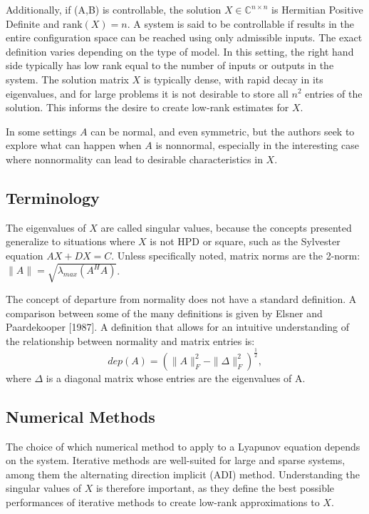 \documentclass[12pt]{scrartcl}
\newcommand{\Cnn}{\mathbb{C}^{n \times n}}
\begin{document}
Additionally, if (A,B) is controllable, the solution $X \in \Cnn$ is Hermitian Positive Definite and $\text{rank}(X) = n$. A system is said to be controllable if results in the entire configuration space can be reached using only admissible inputs. The exact definition varies depending on the type of model. In this setting, the right hand side typically has low rank equal to the number of inputs or outputs in the system. The solution matrix $X$ is typically dense, with rapid decay in its eigenvalues, and for large problems it is not desirable to store all $n^{2}$ entries of the solution. \cite{PEN1} This informs the desire to create low-rank estimates for $X$. 

In some settings $A$ can be normal, and even symmetric, but the authors seek to explore what can happen when $A$ is nonnormal, especially in the interesting case where nonnormality can lead to desirable characteristics in $X$. 

\subsection{Terminology}

The eigenvalues of $X$ are called singular values, because the concepts presented generalize to situations where $X$ is not HPD or square, such as the Sylvester equation $AX + DX = C$. Unless specifically noted, matrix norms are the 2-norm: $\|A\| =\sqrt{\lambda_{max}(A^{H}A)}$.

The concept of departure from normality does not have a standard definition. A comparison between some of the many definitions is given by Elsner and Paardekooper [1987]. A definition that allows for an intuitive understanding of the relationship between normality and matrix entries is: $$dep(A)=\left( \| A \|_{F}^{2} - \| \Delta \|_{F}^{2} \right) ^{\frac{1}{2}},$$ where $\Delta$ is a diagonal matrix whose entries are the eigenvalues of A.

\subsection{Numerical Methods}

The choice of which numerical method to apply to a Lyapunov equation depends on the system. Iterative methods are well-suited for large and sparse systems, among them the alternating direction implicit (ADI) method. \cite{PEN2} Understanding the singular values of $X$ is therefore important, as they define the best possible performances of iterative methods to create low-rank approximations to $X$.
\end{document}
